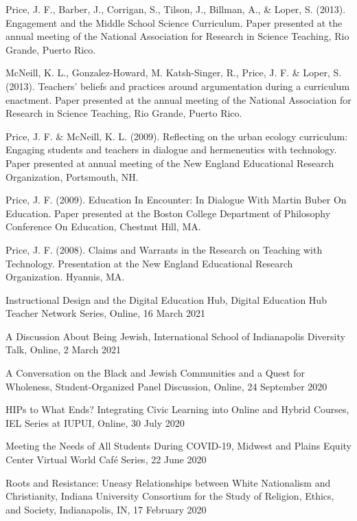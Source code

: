 \documentclass[11pt,article,oneside]{memoir}
\begin{document}
\ind Price, J. F., Barber, J., Corrigan, S., Tilson, J., Billman, A., \& Loper, S. (2013). Engagement and the Middle School Science Curriculum. Paper presented at the annual meeting of the National Association for Research in Science Teaching, Rio Grande, Puerto Rico. 

\ind McNeill, K. L., Gonzalez-Howard, M. Katsh-Singer, R., Price, J. F. \& Loper, S. (2013). Teachers’ beliefs and practices around argumentation during a curriculum enactment. Paper presented at the annual meeting of the National Association for Research in Science Teaching, Rio Grande, Puerto Rico.

\ind Price, J. F. \& McNeill, K. L. (2009). Reflecting on the urban ecology curriculum: Engaging students and teachers in dialogue and hermeneutics with technology. Paper presented at annual meeting of the New England Educational Research Organization, Portsmouth, NH. 

\ind Price, J. F. (2009). Education In Encounter: In Dialogue With Martin Buber On Education. Paper presented at the Boston College Department of Philosophy Conference On Education, Chestnut Hill, MA. 

\ind Price, J. F. (2008). Claims and Warrants in the Research on Teaching with Technology. Presentation at the New England Educational Research Organization. Hyannis, MA.

\newpage




\ind Instructional Design and the Digital Education Hub, Digital Education Hub Teacher Network Series, Online, 16 March 2021

\ind A Discussion About Being Jewish, International School of Indianapolis Diversity Talk, Online, 2 March 2021

\ind A Conversation on the Black and Jewish Communities and a Quest for Wholeness, Student-Organized Panel Discussion, Online, 24 September 2020

\ind HIPs to What Ends? Integrating Civic Learning into Online and Hybrid Courses, IEL Series at IUPUI, Online, 30 July 2020

\ind Meeting the Needs of All Students During COVID-19, Midwest and Plains Equity Center Virtual World Café Series, 22 June 2020

\ind Roots and Resistance: Uneasy Relationships between White Nationalism and Christianity, Indiana University Consortium for the Study of Religion, Ethics, and Society, Indianapolis, IN, 17 February 2020
\end{document}
